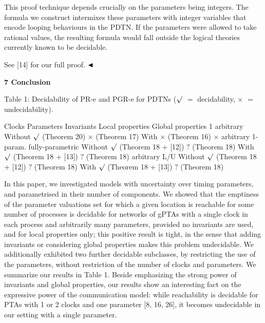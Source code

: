 \documentclass[10pt,a4paper]{article}
\begin{document}
 
 
This proof technique depends crucially on the parameters being integers. The formula we construct intermixes these parameters with integer variables that encode looping behaviours in the PDTN. If the parameters were allowed to take rational values, the resulting formula would fall outside the logical theories currently known to be decidable.\par
 
 
 
See [14] for our full proof. $\hfill\blacktriangleleft$\par
 
 
 
 


 
\par\medskip\noindent\textbf{7 Conclusion}\par
 
 
Table 1: Decidability of PR-e and PGR-e for PDTNs ($\surd$ $=$ decidability, $\times$ $=$ undecidability).\par
    Clocks Parameters Invariants Local properties Global properties   1 arbitrary Without  $\surd$ (Theorem 20)   $\times$ (Theorem 17)    With  $\times$ (Theorem 16)  $\times$   arbitrary 1-param. fully-parametric Without  $\surd$ (Theorem 18 + [12])   $?$ (Theorem 18)    With  $\surd$ (Theorem 18 + [13])   $?$ (Theorem 18)    arbitrary L/U Without  $\surd$ (Theorem 18 + [12])   $?$ (Theorem 18)    With  $\surd$ (Theorem 18 + [13])   $?$ (Theorem 18)     
 
 
In this paper, we investigated models with uncertainty over timing parameters, and parametrised in their number of components. We showed that the emptiness of the parameter valuations set for which a given location is reachable for some number of processes is decidable for networks of gPTAs with a single clock in each process and arbitrarily many parameters, provided no invariants are used, and for local properties only; this positive result is tight, in the sense that adding invariants or considering global properties makes this problem undecidable. We additionally exhibited two further decidable subclasses, by restricting the use of the parameters, without restriction of the number of clocks and parameters. We summarize our results in Table 1. Beside emphasizing the strong power of invariants and global properties, our results show an interesting fact on the expressive power of the communication model: while reachability is decidable for PTAs with 1 or 2 clocks and one parameter [8, 16, 26], it becomes undecidable in our setting with a single parameter.\par
 
\end{document}
